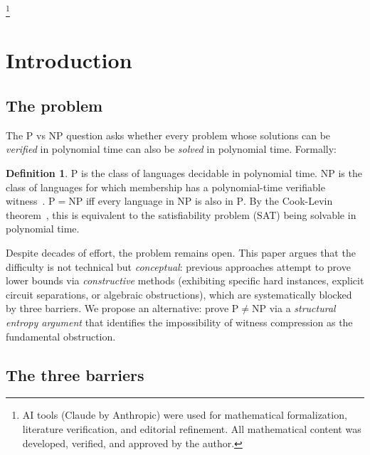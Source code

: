 \documentclass[aps,prd,twocolumn,superscriptaddress,nofootinbib]{revtex4-2}
\theoremstyle{definition}
\newtheorem{definition}[theorem]{Definition}
\theoremstyle{remark}
\newcommand{\NP}{\mathrm{NP}}
\newcommand{\PP}{\mathrm{P}}
\begin{document}

\thanks{AI tools (Claude by Anthropic) were used for mathematical formalization, literature verification, and editorial refinement. All mathematical content was developed, verified, and approved by the author.}

\maketitle


\section{Introduction}
\label{sec:intro}

\subsection{The problem}

The $\PP$ vs $\NP$ question asks whether every problem whose solutions can be \textit{verified} in polynomial time can also be \textit{solved} in polynomial time. Formally:

\begin{definition}
$\PP$ is the class of languages decidable in polynomial time. $\NP$ is the class of languages for which membership has a polynomial-time verifiable witness~\cite{Arora2009}. $\PP = \NP$ iff every language in $\NP$ is also in $\PP$. By the Cook-Levin theorem~\cite{Cook1971}, this is equivalent to the satisfiability problem (SAT) being solvable in polynomial time.
\end{definition}

Despite decades of effort, the problem remains open. This paper argues that the difficulty is not technical but \textit{conceptual}: previous approaches attempt to prove lower bounds via \textit{constructive} methods (exhibiting specific hard instances, explicit circuit separations, or algebraic obstructions), which are systematically blocked by three barriers. We propose an alternative: prove $\PP \neq \NP$ via a \textit{structural entropy argument} that identifies the impossibility of witness compression as the fundamental obstruction.

\subsection{The three barriers}
\end{document}
